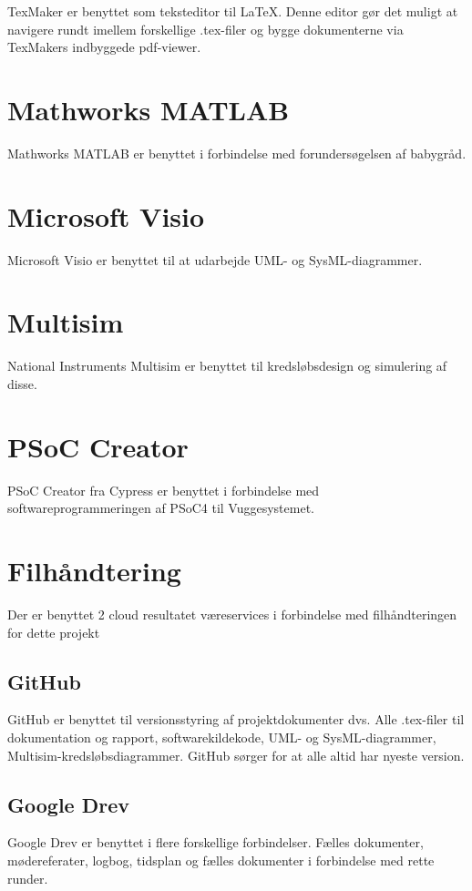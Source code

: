 TexMaker er benyttet som teksteditor til \LaTeX. Denne editor gør det muligt at navigere rundt imellem forskellige .tex-filer og bygge dokumenterne via TexMakers indbyggede pdf-viewer.

\section*{Mathworks MATLAB}
Mathworks MATLAB er benyttet i forbindelse med forundersøgelsen af babygråd. 

\section*{Microsoft Visio}
Microsoft Visio er benyttet til at udarbejde UML- og SysML-diagrammer. 

\section*{Multisim}
National Instruments Multisim er benyttet til kredsløbsdesign og simulering af disse. 

\section*{PSoC Creator}
PSoC Creator fra Cypress er benyttet i forbindelse med softwareprogrammeringen af PSoC4 til Vuggesystemet. 


\section*{Filhåndtering}
Der er benyttet 2 cloud resultatet væreservices i forbindelse med filhåndteringen for dette projekt

\subsection*{GitHub}
GitHub er benyttet til versionsstyring af projektdokumenter dvs. Alle .tex-filer til dokumentation og rapport, softwarekildekode, UML- og SysML-diagrammer, Multisim-kredsløbsdiagrammer. GitHub sørger for at alle altid har nyeste version. 

\subsection*{Google Drev}
Google Drev er benyttet i flere forskellige forbindelser. Fælles dokumenter, mødereferater, logbog, tidsplan og fælles dokumenter i forbindelse med rette runder.